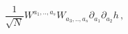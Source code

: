 \begin{equation}
\label{bulkcubic}
\frac{1}{\sqrt{N}}W^{a_1,..,a_s}W_{a_3,..,a_s}\partial_{a_1}\partial_{a_2} h\,,
\end{equation}


